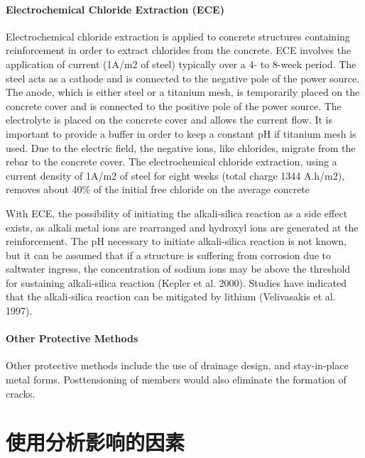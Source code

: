 \paragraph{Electrochemical Chloride Extraction (ECE)}
Electrochemical chloride extraction is applied to concrete structures containing reinforcement in order to extract chlorides from the concrete. ECE involves the application of current (1A/m2 of steel) typically over a 4- to 8-week period. The steel acts as a cathode and is connected to the negative pole of the power source. The anode, which is either steel or a titanium mesh, is temporarily placed on the concrete cover and is connected to the positive pole of the power source. The electrolyte is placed on the concrete cover and allows the current flow. It is important to provide a buffer in order to keep a constant pH if titanium mesh is used. Due to the electric field, the negative ions, like chlorides, migrate from the rebar to the concrete cover. The electrochemical chloride extraction, using a current density of 1A/m2 of steel for eight weeks (total charge 1344 A.h/m2), removes about 40\% of the initial free chloride on the average concrete

With ECE, the possibility of initiating the alkali-silica reaction as a side effect exists, as alkali metal ions are rearranged and hydroxyl ions are generated at the reinforcement. The pH necessary to initiate alkali-silica reaction is not known, but it can be assumed that if a structure is suffering from corrosion due to saltwater ingress, the concentration of sodium ions may be above the threshold for sustaining alkali-silica reaction (Kepler et al. 2000).  Studies have indicated that the alkali-silica reaction can be mitigated by lithium (Velivasakis et al. 1997).
\paragraph{Other Protective Methods}

Other protective methods include the use of drainage design, and stay-in-place metal forms. Posttensioning of members would also eliminate the formation of cracks.

\section{使用分析影响的因素}
\label{sec:factor-influence-fault-tree}
